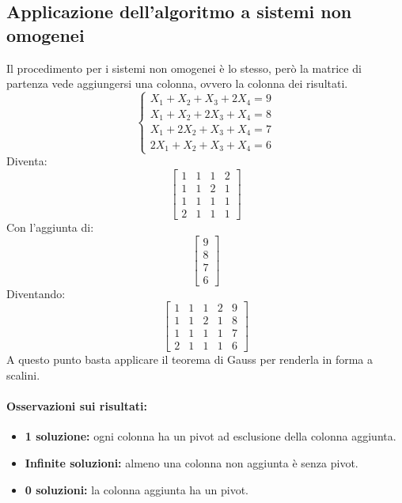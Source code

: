\documentclass[12pt,a4paper]{article}
\begin{document}
\subsection{Applicazione dell'algoritmo a sistemi non omogenei}
Il procedimento per i sistemi non omogenei è lo stesso, però la matrice di partenza vede aggiungersi una colonna, ovvero la colonna dei risultati.
\[
\begin{cases}
  X_1 + X_2 + X_3 + 2X_4 = 9\\
  X_1 + X_2 + 2X_3 + X_4 = 8\\
  X_1 + 2X_2 + X_3 + X_4 = 7\\
  2X_1 + X_2 + X_3 + X_4 = 6
\end{cases}
\]
Diventa:
\[
\begin{bmatrix}
1 & 1 & 1 & 2 \\
1 & 1 & 2 & 1 \\
1 & 1 & 1 & 1 \\
2 & 1 & 1 & 1
\end{bmatrix}
\]
Con l'aggiunta di:
\[
\begin{bmatrix}
9\\
8\\
7\\
6
\end{bmatrix}
\]
Diventando:
\[
\begin{bmatrix}
1 & 1 & 1 & 2 & 9 \\
1 & 1 & 2 & 1 & 8 \\
1 & 1 & 1 & 1 & 7\\
2 & 1 & 1 & 1 & 6
\end{bmatrix}
\]
A questo punto basta applicare il teorema di Gauss per renderla in forma a scalini.
\paragraph{Osservazioni sui risultati:}
\begin{itemize}
  \item \textbf{1 soluzione:} ogni colonna ha un pivot ad esclusione della colonna aggiunta.
  \item \textbf{Infinite soluzioni:} almeno una colonna non aggiunta è senza pivot.
  \item \textbf{0 soluzioni:} la colonna aggiunta ha un pivot.
\end{itemize}
\end{document}
